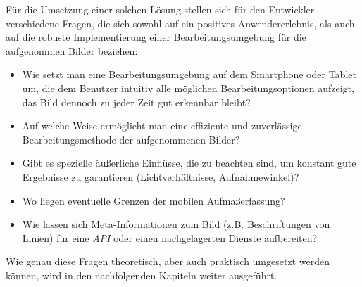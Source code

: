 \noindent
Für die Umsetzung einer solchen Lösung stellen sich für den Entwickler verschiedene Fragen, die sich sowohl auf ein positives Anwendererlebnis, als auch auf die robuste Implementierung einer Bearbeitungsumgebung für die aufgenommen Bilder beziehen:

\begin{itemize}
  \item Wie setzt man eine Bearbeitungsumgebung auf dem Smartphone oder Tablet um, die dem Benutzer intuitiv alle möglichen Bearbeitungsoptionen aufzeigt, das Bild dennoch zu jeder Zeit gut erkennbar bleibt?
  \item Auf welche Weise ermöglicht man eine effiziente und zuverlässige Bearbeitungsmethode der aufgenommenen Bilder?
  \item Gibt es spezielle äußerliche Einflüsse, die zu beachten sind, um konstant gute Ergebnisse zu garantieren (Lichtverhältnisse, Aufnahmewinkel)?
  \item Wo liegen eventuelle Grenzen der mobilen Aufmaßerfassung?
  \item Wie lassen sich Meta-Informationen zum Bild (z.B. Beschriftungen von Linien) für eine \emph{API} oder einen nachgelagerten Dienste aufbereiten?
\end{itemize}

\noindent
Wie genau diese Fragen theoretisch, aber auch praktisch umgesetzt werden können, wird in den nachfolgenden Kapiteln weiter ausgeführt.
